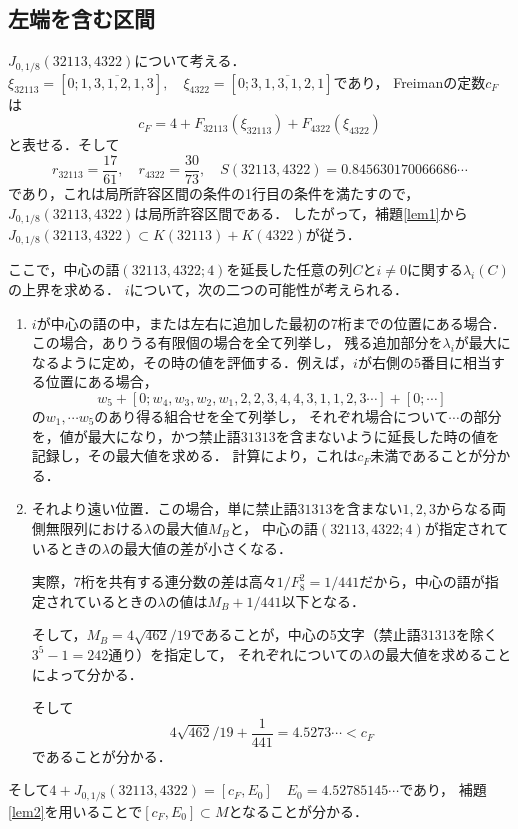 \documentclass[10pt,a4paper]{ujarticle}
\theoremstyle{definition}
\begin{document}
\subsection{左端を含む区間}
$J_{0, 1/8}(32113,4322)$について考える．
$\xi_{32113} = [0; \overline{1, 3, 1, 2, 1, 3}], \quad \xi_{4322} = [0; \overline{3, 1, 3, 1, 2, 1}]$であり，
Freimanの定数$c_F$は
\[
c_F = 4 + F_{32113}(\xi_{32113}) + F_{4322}(\xi_{4322})
\]
と表せる．そして
\[
r_{32113} = \frac{17}{61}, \quad r_{4322} = \frac{30}{73}, \quad S(32113, 4322) = 0.845630170066686\cdots
\]
であり，これは局所許容区間の条件の1行目の条件を満たすので，$J_{0, 1/8}(32113,4322)$は局所許容区間である．
したがって，補題\ref{lem1}から$J_{0, 1/8}(32113,4322) \subset K(32113) + K(4322)$が従う．

ここで，中心の語$(32113, 4322; 4)$を延長した任意の列$C$と$i \neq 0$に関する$\lambda_i(C)$の上界を求める．
$i$について，次の二つの可能性が考えられる．
\begin{enumerate}
    \item $i$が中心の語の中，または左右に追加した最初の7桁までの位置にある場合．この場合，ありうる有限個の場合を全て列挙し，
    残る追加部分を$\lambda_i$が最大になるように定め，その時の値を評価する．例えば，$i$が右側の$5$番目に相当する位置にある場合，
    \[
    w_5 + [0; w_4, w_3, w_2, w_1, 2, 2, 3, 4, 4, 3, 1, 1, 2, 3\cdots] + [0; \cdots]
    \]
    の$w_1,\cdots w_5$のあり得る組合せを全て列挙し，
    それぞれ場合について$\cdots$の部分を，値が最大になり，かつ禁止語$31313$を含まないように延長した時の値を記録し，その最大値を求める．
    計算により，これは$c_F$未満であることが分かる．
    \item それより遠い位置．この場合，単に禁止語$31313$を含まない$1,2,3$からなる両側無限列における$\lambda$の最大値$M_B$と，
    中心の語$(32113, 4322; 4)$が指定されているときの$\lambda$の最大値の差が小さくなる．

    実際，7桁を共有する連分数の差は高々$1/F_8^2 = 1 / 441$だから，中心の語が指定されているときの$\lambda$の値は$M_B + 1 / 441$以下となる．
    
    そして，$M_B = 4\sqrt{462} / 19$であることが，中心の5文字（禁止語$31313$を除く$3^5 - 1 = 242$通り）を指定して，
    それぞれについての$\lambda$の最大値を求めることによって分かる．

    そして
    \[
    4\sqrt{462} / 19 + \frac{1}{441} = 4.5273\cdots < c_F
    \]
    であることが分かる．
\end{enumerate}


そして$4 + J_{0, 1/8}(32113,4322) =[c_F, E_0]\quad E_0 = 4.52785145\cdots$であり，
補題\ref{lem2}を用いることで$[c_F, E_0]\subset M$となることが分かる．
\end{document}
